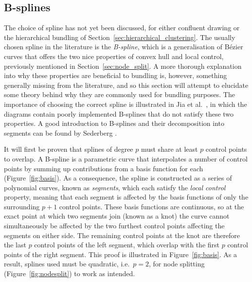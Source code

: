 \subsection{B-splines}
\label{sec:bspline_details}
The choice of spline has not yet been discussed, for either confluent drawing or the hierarchical bundling of Section~\ref{sec:hierarchical_clustering}. 
The usually chosen spline in the literature is the \emph{B-spline}, which is a generalisation of B\'ezier curves that offers the two nice properties of convex hull and local control, previously mentioned in Section~\ref{sec:node_split}.
A more thorough explanation into why these properties are beneficial to bundling is, however, something generally missing from the literature, and so this section will attempt to elucidate some theory behind why they are commonly used for bundling purposes.
The importance of choosing the correct spline is illustrated in Jia et al.\ \cite{Jia2011}, in which the diagrams contain poorly implemented B-splines that do not satisfy these two properties.
A good introduction to B-splines and their decomposition into segments can be found by Sederberg \cite{Sederberg2005}.

It will first be proven that splines of degree $p$ must share at least $p$ control points to overlap. A B-spline is a parametric curve that interpolates a number of control points by summing up contributions from a basis function for each (Figure~\ref{fig:basis}). As a consequence, the spline is constructed as a series of polynomial
curves, known as \emph{segments}, which each satisfy
the \emph{local control} property, meaning that each segment is affected by the basis functions of only the surrounding $p+1$ control points. These basis functions are continuous, so at the exact point at which two segments join (known as a knot) the curve cannot simultaneously be affected by the two furthest control points affecting the segments on either side. The remaining control points at the knot are therefore the last $p$ control points of the left segment, which overlap with the first $p$ control points of the right segment.
This proof is illustrated in Figure~\ref{fig:basis}. As a result, splines used must be quadratic, i.e.\ $p=2$, for node splitting (Figure~\ref{fig:nodesplit}) to work as intended.

